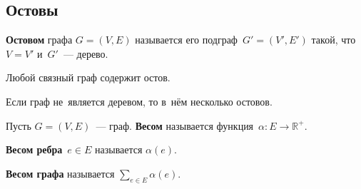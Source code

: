 \subsection{Остовы}
\textbf{Остовом} графа $G = (V, E)$ называется его подграф~$G' = (V', E')$ такой, что $V = V'$ и~$G'$~--- дерево.

\begin{statement}
Любой связный граф содержит остов.
\end{statement}

\begin{statement}
Если граф не~является деревом, то в~нём несколько остовов.
\end{statement}

Пусть $G = (V, E)$~--- граф.
\textbf{Весом} называется функция~$\alpha \colon E \to \mathbb R^+$.

\textbf{Весом ребра}~$e \in E$ называется $\alpha(e)$.

\textbf{Весом графа} называется $\sum_{e \in E} \alpha(e)$.


